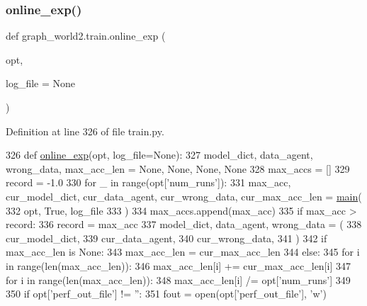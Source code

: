 \subsubsection{\texorpdfstring{online\+\_\+exp()}{online\_exp()}}
{\footnotesize\ttfamily def graph\+\_\+world2.\+train.\+online\+\_\+exp (\begin{DoxyParamCaption}\item[{}]{opt,  }\item[{}]{log\+\_\+file = {\ttfamily None} }\end{DoxyParamCaption})}



Definition at line 326 of file train.\+py.


\begin{DoxyCode}
326 \textcolor{keyword}{def }\hyperlink{namespacegraph__world2_1_1train_a8f5e91b9cb92f65b8b096d7eb5dbf2e7}{online\_exp}(opt, log\_file=None):
327     model\_dict, data\_agent, wrong\_data, max\_acc\_len = \textcolor{keywordtype}{None}, \textcolor{keywordtype}{None}, \textcolor{keywordtype}{None}, \textcolor{keywordtype}{None}
328     max\_accs = []
329     record = -1.0
330     \textcolor{keywordflow}{for} \_ \textcolor{keywordflow}{in} range(opt[\textcolor{stringliteral}{'num\_runs'}]):
331         max\_acc, cur\_model\_dict, cur\_data\_agent, cur\_wrong\_data, cur\_max\_acc\_len = 
      \hyperlink{namespacegraph__world2_1_1train_af3dec887619817c1a7a38930ffcfd1cb}{main}(
332             opt, \textcolor{keyword}{True}, log\_file
333         )
334         max\_accs.append(max\_acc)
335         \textcolor{keywordflow}{if} max\_acc > record:
336             record = max\_acc
337             model\_dict, data\_agent, wrong\_data = (
338                 cur\_model\_dict,
339                 cur\_data\_agent,
340                 cur\_wrong\_data,
341             )
342         \textcolor{keywordflow}{if} max\_acc\_len \textcolor{keywordflow}{is} \textcolor{keywordtype}{None}:
343             max\_acc\_len = cur\_max\_acc\_len
344         \textcolor{keywordflow}{else}:
345             \textcolor{keywordflow}{for} i \textcolor{keywordflow}{in} range(len(max\_acc\_len)):
346                 max\_acc\_len[i] += cur\_max\_acc\_len[i]
347     \textcolor{keywordflow}{for} i \textcolor{keywordflow}{in} range(len(max\_acc\_len)):
348         max\_acc\_len[i] /= opt[\textcolor{stringliteral}{'num\_runs'}]
349 
350     \textcolor{keywordflow}{if} opt[\textcolor{stringliteral}{'perf\_out\_file'}] != \textcolor{stringliteral}{''}:
351         fout = open(opt[\textcolor{stringliteral}{'perf\_out\_file'}], \textcolor{stringliteral}{'w'})

\end{DoxyCode}
